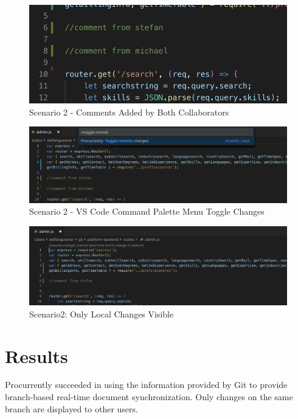 \begin{figure}
    \centering
    \includegraphics[width=1\textwidth]{figures/screenshots/scenarios/2comments.png}
    \caption{Scenario 2 - Comments Added by Both Collaborators}
    \label{fig:2comments}
\end{figure}
\begin{figure}
    \centering
    \includegraphics[width=1\linewidth]{figures/screenshots/scenarios/2togglechanges.png}
    \caption{Scenario 2 - VS Code Command Palette Menu Toggle Changes}
    \label{fig:2togglechanges}
\end{figure}

\begin{figure}[hb]
    \centering
    \includegraphics[width=1\textwidth]{figures/screenshots/scenarios/2onlylocalchanges.png}
	\caption{Scenario2: Only Local Changes Visible}
    \label{fig:2onlylocalchanges}
\end{figure}

\section{Results}
Procurrently succeeded in using the information provided by Git to provide branch-based real-time document synchronization. Only changes on the same branch are displayed to other users.


